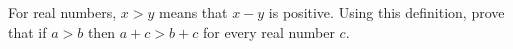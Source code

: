 For real numbers, $x>y$ means that $x-y$ is positive. Using this definition, prove that if $a>b$ then $a+c>b+c$ for every real number $c$.
